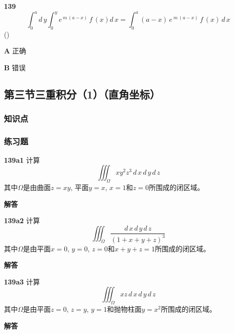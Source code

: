 \documentclass[a4paper,10pt]{article} %
\begin{document}
\textheight


\par\noindent \textbf{139} \quad 
$$ \int_0^ad\,y\int_0^y e^{\,m\,(a-x)}\,f\,(x)d\,x
=
\int_0^a(a-x)\,e\,^{m\,(a-x)}\,f\,(x)\,d\,x$$
\hfill (\quad\quad\quad)
\par\noindent \textbf{A} \quad 正确
\par\noindent \textbf{B} \quad 错误





\textheight

\newpage
\subsection{第三节\quad 三重积分（1）（直角坐标）}
\subsubsection{知识点}
\subsubsection{练习题}
\par\noindent \textbf{139a1} \quad 计算
$$ \iiint_{\Omega} xy^2z^3\,d\,x\,d\,y\,d\,z$$
其中$\Omega$是由曲面$z=xy$, 平面$y=x$, $x=1$和$z=0$所围成的闭区域。
\par\noindent \textbf{ 解答}


\textheight

\par\noindent \textbf{139a2} \quad 计算
$$ \iiint_{\Omega} \frac{d\,x\,d\,y\,d\,z}{(1+x+y+z)^3}$$
其中$\Omega$是由平面$x=0$, $y=0$, $z=0$和$x+y+z=1$所围成的闭区域。
\par\noindent \textbf{ 解答}


\textheight

\par\noindent \textbf{139a3} \quad 计算
$$ \iiint_{\Omega} xz\,d\,x\,d\,y\,d\,z$$
其中$\Omega$是由平面$z=0$, $z=y$, $y=1$和抛物柱面$y=x^2$所围成的闭区域。
\par\noindent \textbf{ 解答}
\end{document}
